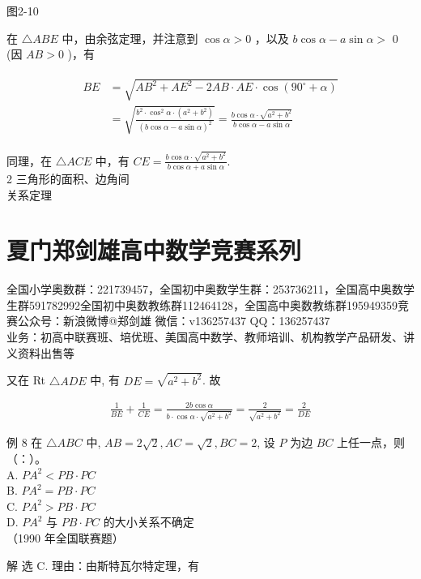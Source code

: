 \documentclass[10pt]{article}
\begin{document}
图2-10

在 $\triangle A B E$ 中，由余弦定理，并注意到 $\cos \alpha>0$ ，以及 $b \cos \alpha-a \sin \alpha>$ 0 (因 $A B>0$ )，有

\begin{align*}
\begin{aligned}
B E & =\sqrt{A B^{2}+A E^{2}-2 A B \cdot A E \cdot \cos \left(90^{\circ}+\alpha\right)} \\
& =\sqrt{\frac{b^{2} \cdot \cos ^{2} \alpha \cdot\left(a^{2}+b^{2}\right)}{(b \cos \alpha-a \sin \alpha)^{2}}}=\frac{b \cos \alpha \cdot \sqrt{a^{2}+b^{2}}}{b \cos \alpha-a \sin \alpha}
\end{aligned}
\end{align*}

同理，在 $\triangle A C E$ 中，有 $C E=\frac{b \cos \alpha \cdot \sqrt{a^{2}+b^{2}}}{b \cos \alpha+a \sin \alpha}$.\\
2 三角形的面积、边角间\\
关系定理

\section*{夏门郑剑雄高中数学竞赛系列}
全国小学奥数群：221739457，全国初中奥数学生群：253736211，全国高中奥数学生群591782992全国初中奥数教练群112464128，全国高中奥数教练群195949359竞赛公众号：新浪微博@郑剑雄 微信：v136257437 QQ：136257437\\
业务：初高中联赛班、培优班、美国高中数学、教师培训、机构教学产品研发、讲义资料出售等

又在 Rt $\triangle A D E$ 中, 有 $D E=\sqrt{a^{2}+b^{2}}$. 故

\begin{align*}
\frac{1}{B E}+\frac{1}{C E}=\frac{2 b \cos \alpha}{b \cdot \cos \alpha \cdot \sqrt{a^{2}+b^{2}}}=\frac{2}{\sqrt{a^{2}+b^{2}}}=\frac{2}{D E}
\end{align*}

例 8 在 $\triangle A B C$ 中, $A B=2 \sqrt{2}, A C=\sqrt{2}, B C=2$, 设 $P$ 为边 $B C$ 上任一点，则（：）。\\
A. $P A^{2}<P B \cdot P C$\\
B. $P A^{2}=P B \cdot P C$\\
C. $P A^{2}>P B \cdot P C$\\
D. $P A^{2}$ 与 $P B \cdot P C$ 的大小关系不确定\\
（1990 年全国联赛题）

解 选 C. 理由：由斯特瓦尔特定理，有
\end{document}
